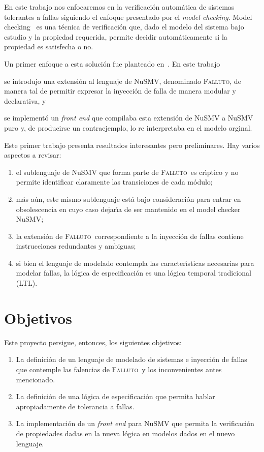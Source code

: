 \documentclass[12pt]{article}
\newcommand{\falluto}{\textsc{Falluto}}
\begin{document}
En este trabajo nos enfocaremos en la verificaci\'on autom\'atica de
sistemas tolerantes a fallas siguiendo el enfoque presentado por el
\emph{model checking}.
%
Model checking~\cite{CGP99,BK2008} es una t\'ecnica de verificaci\'on
que, dado el modelo del sistema bajo estudio y la propiedad requerida,
permite decidir autom\'aticamente si la propiedad es satisfecha o no.

Un primer enfoque a esta soluci\'on fue planteado en~\cite{Hames2009}.
En este trabajo
\begin{inparaenum}[(1)]
\item%
  se introdujo una extensi\'on al lenguaje de NuSMV, denominado
  \falluto, de manera tal de permitir expresar la inyecci\'on de falla
  de manera modular y declarativa, y
\item%
  se implement\'o un \emph{front end} que compilaba esta extensi\'on
  de NuSMV a NuSMV puro y, de producirse un contraejemplo, lo re
  interpretaba en el modelo orginal.
\end{inparaenum}

Este primer trabajo presenta resultados interesantes pero
preliminares.  Hay varios aspectos a revisar:
%
\begin{enumerate}
\item%
  el sublenguaje de NuSMV que forma parte de \falluto\ es
  cr\'\i{}ptico y no permite identificar claramente las transiciones
  de cada m\'odulo;
\item
  m\'as a\'un, este mismo sublenguaje est\'a bajo consideraci\'on para
  entrar en obsolescencia en cuyo caso dejar\'\i{}a de ser mantenido
  en el model checker NuSMV;
\item%
  la extensi\'on de \falluto\ correspondiente a la inyecci\'on de
  fallas contiene instrucciones redundantes y ambiguas;
\item%
  si bien el lenguaje de modelado contempla las caracter\'\i{}sticas
  necesarias para modelar fallas, la l\'ogica de especificaci\'on es
  una l\'ogica temporal tradicional (LTL).
\end{enumerate}


\section{Objetivos}

Este proyecto persigue, entonces, los siguientes objetivos:

\begin{enumerate}
\item%
  La definici\'on de un lenguaje de modelado de sistemas e inyecci\'on
  de fallas que contemple las falencias de \falluto\ y los
  inconvenientes antes mencionado.
\item%
  La definici\'on de una l\'ogica de especificaci\'on que permita
  hablar apropiadamente de tolerancia a fallas.
\item%
  La implementaci\'on de un \emph{front end} para NuSMV que permita la
  verificaci\'on de propiedades dadas en la nueva l\'ogica en modelos
  dados en el nuevo lenguaje.
\end{enumerate}
\end{document}
